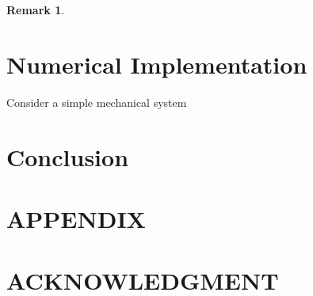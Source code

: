 \documentclass[letterpaper, 10 pt, conference]{ieeeconf}  %
\newtheorem{remark}{Remark}
\begin{document}
\begin{remark}

\end{remark}

\section{Numerical Implementation}
Consider a simple mechanical system 

\section{Conclusion}

\section*{APPENDIX}

\section*{ACKNOWLEDGMENT}





\end{document}
